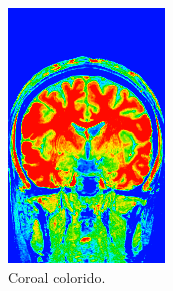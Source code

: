 \documentclass{article}
\begin{document}
\begin{figure}[h]
\begin{subfigure}[b]{0.3\textwidth}
        \includegraphics[width=\textwidth]{brain/radiologist-coronal.png}
        \caption{Coroal colorido.}
    \end{subfigure}
    ~
    \begin{subfigure}[b]{0.3\textwidth}

\end{subfigure}
\end{figure}
\end{document}
